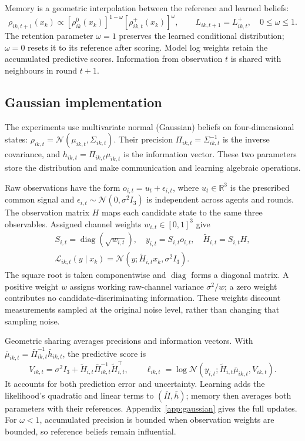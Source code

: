 \documentclass[runningheads]{llncs}
\newcommand{\Normal}{\mathcal N}
\newcommand{\diag}{\operatorname{diag}}
\newcommand{\R}{\mathbb R}
\begin{document}
Memory is a geometric interpolation between the reference and learned beliefs:
\begin{equation}
 \rho_{ik,t+1}(x_k)\propto
       [\rho^0_{ik}(x_k)]^{1-\omega}[\rho^+_{ik,t}(x_k)]^{\omega},\qquad
 L_{ik,t+1}=L^+_{ik,t},\quad 0\leq\omega\leq1.
 \label{eq:memory}
\end{equation}
The retention parameter $\omega=1$ preserves the learned conditional distribution;
$\omega=0$ resets it to its reference after scoring. Model log weights retain
the accumulated predictive scores. Information from observation $t$ is shared
with neighbours in round $t+1$.

\subsection{Gaussian implementation}
\label{sec:gaussian}
The experiments use multivariate normal (Gaussian) beliefs on four-dimensional states:
$\rho_{ik,t}=\Normal(\mu_{ik,t},\Sigma_{ik,t})$.
Their precision $\Pi_{ik,t}=\Sigma_{ik,t}^{-1}$ is the inverse covariance, and
$h_{ik,t}=\Pi_{ik,t}\mu_{ik,t}$ is the information vector. These two parameters
store the distribution and make communication and learning algebraic operations.

Raw observations have the form $o_{i,t}=u_t+\epsilon_{i,t}$, where $u_t\in\R^3$
is the prescribed common signal and $\epsilon_{i,t}\sim\Normal(0,\sigma^2I_3)$
is independent across agents and rounds. The observation matrix $H$ maps each
candidate state to the same three observables. Assigned channel weights
$w_{i,t}\in[0,1]^3$ give
\begin{equation}
 \begin{gathered}
 S_{i,t}=\diag(\sqrt{w_{i,t}}),\quad y_{i,t}=S_{i,t}o_{i,t},\quad
 \widetilde H_{i,t}=S_{i,t}H,\\
 \mathcal L_{ik,t}(y\mid x_k)=\Normal(y;\widetilde H_{i,t}x_k,\sigma^2I_3).
 \end{gathered}
 \label{eq:attention}
\end{equation}
The square root is taken componentwise and $\diag$ forms a diagonal matrix.
A positive weight $w$ assigns working raw-channel variance $\sigma^2/w$; a zero
weight contributes no candidate-discriminating information. These weights discount
measurements sampled at the original noise level, rather than changing that
sampling noise.

Geometric sharing averages precisions and information vectors. With
$\bar\mu_{ik,t}=\bar\Pi_{ik,t}^{-1}\bar h_{ik,t}$, the predictive score is
\begin{equation}
 V_{ik,t}=\sigma^2I_3+
    \widetilde H_{i,t}\bar\Pi_{ik,t}^{-1}\widetilde H_{i,t}^{\top},\qquad
 \ell_{ik,t}=\log\Normal(y_{i,t};\widetilde H_{i,t}\bar\mu_{ik,t},V_{ik,t}).
 \label{eq:gaussian-score}
\end{equation}
It accounts for both prediction error and uncertainty. Learning adds the
likelihood's quadratic and linear terms to $(\bar\Pi,\bar h)$; memory then
averages both parameters with their references. Appendix~\ref{app:gaussian}
gives the full updates. For $\omega<1$, accumulated precision is bounded when
observation weights are bounded, so reference beliefs remain influential.
\end{document}
